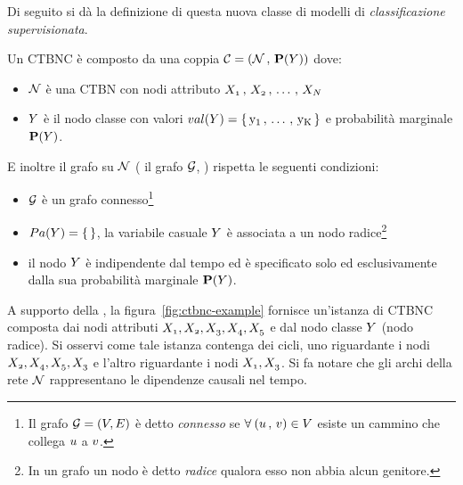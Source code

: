 Di seguito si dà la definizione di questa nuova classe di modelli di \emph{classificazione supervisionata}.
\begin{definizione}\label{defn:ctbnc}
Un \acf{CTBNC} è composto da una coppia $\mathcal{C}=(\mathcal{N}\,,\,\mathbf{P}(\mathnormal{Y}))$ dove:
\begin{itemize}
    \item $\mathcal{N}$ è una \acs{CTBN} con nodi attributo $\mathnormal{X_1}\,,\,\mathnormal{X_2}\,,\,\dotsc\,,\,\mathnormal{X_N}$
    \item $\mathnormal{Y}$ è il nodo classe con valori $val(\mathnormal{Y})=\{\,\mathrm{y_1}\,,\,\dotsc\,,\,\mathrm{y_K}\,\}$ e probabilità marginale $\mathbf{P}(\mathnormal{Y})$.
\end{itemize}
E inoltre il grafo su $\mathcal{N}$ (\ie{} il grafo $\mathcal{G}$, ) rispetta le seguenti condizioni:
\begin{itemize}
    \item $\mathcal{G}$ è un grafo connesso\footnote{Il grafo $\mathcal{G} = (\mathnormal{V}, \mathnormal{E})$ è detto \emph{connesso} se $\forall \: (\mathnormal{u}\,,\,\mathnormal{v}) \in \mathnormal{V}$ esiste un cammino che collega $\mathnormal{u}$ a $\mathnormal{v}$.}
    \item $Pa(\mathnormal{Y})=\{\,\}$, \ie{} la variabile casuale $\mathnormal{Y}$ è associata a un nodo radice\footnote{In un grafo un nodo è detto \emph{radice} qualora esso non abbia alcun genitore.}
    \item il nodo $\mathnormal{Y}$ è indipendente dal tempo ed è specificato solo ed esclusivamente dalla sua probabilità marginale $\mathbf{P}(\mathnormal{Y})$.
\end{itemize}
\end{definizione}
A supporto della , la figura~\vref{fig:ctbnc-example} fornisce un'istanza di \acs{CTBNC} composta dai nodi attributi $\mathnormal{X_1},\mathnormal{X_2},\mathnormal{X_3},\mathnormal{X_4},\mathnormal{X_5}$ e dal nodo classe $\mathnormal{Y}$ (nodo radice). Si osservi come tale istanza contenga dei cicli, uno riguardante i nodi $\mathnormal{X_2},\mathnormal{X_4},\mathnormal{X_5},\mathnormal{X_3}$ e l'altro riguardante i nodi $\mathnormal{X_1},\mathnormal{X_3}$. Si fa notare che gli archi della rete $\mathcal{N}$ rappresentano le dipendenze causali nel tempo.

\newpage

